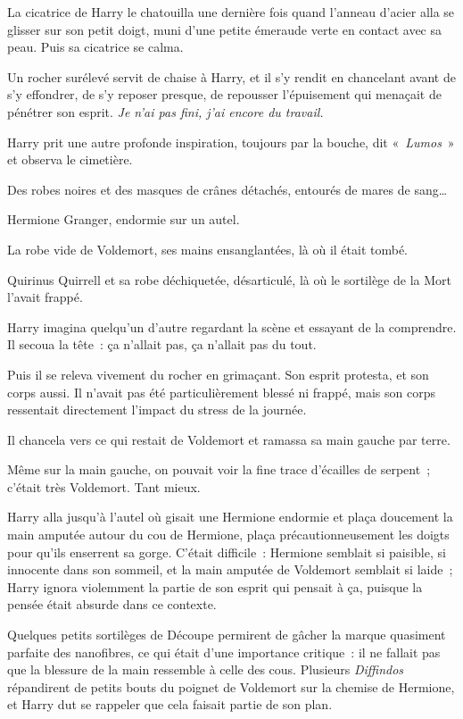 La cicatrice de Harry le chatouilla une dernière fois quand l'anneau d'acier alla se glisser sur son petit doigt, muni d'une petite émeraude verte en contact avec sa peau. Puis sa cicatrice se calma.

Un rocher surélevé servit de chaise à Harry, et il s'y rendit en chancelant avant de s'y effondrer, de s'y reposer presque, de repousser l'épuisement qui menaçait de pénétrer son esprit. \emph{Je n'ai pas fini, j'ai encore du travail.}

Harry prit une autre profonde inspiration, toujours par la bouche, dit «~\emph{Lumos}~» et observa le cimetière.

Des robes noires et des masques de crânes détachés, entourés de mares de sang…

Hermione Granger, endormie sur un autel.

La robe vide de Voldemort, ses mains ensanglantées, là où il était tombé.

Quirinus Quirrell et sa robe déchiquetée, désarticulé, là où le sortilège de la Mort l'avait frappé.

Harry imagina quelqu'un d'autre regardant la scène et essayant de la comprendre. Il secoua la tête~: ça n'allait pas, ça n'allait pas du tout.

Puis il se releva vivement du rocher en grimaçant. Son esprit protesta, et son corps aussi. Il n'avait pas été particulièrement blessé ni frappé, mais son corps ressentait directement l'impact du stress de la journée.

Il chancela vers ce qui restait de Voldemort et ramassa sa main gauche par terre.

Même sur la main gauche, on pouvait voir la fine trace d'écailles de serpent~; c'était très Voldemort. Tant mieux.

Harry alla jusqu'à l'autel où gisait une Hermione endormie et plaça doucement la main amputée autour du cou de Hermione, plaça précautionneusement les doigts pour qu'ils enserrent sa gorge. C'était difficile~: Hermione semblait si paisible, si innocente dans son sommeil, et la main amputée de Voldemort semblait si laide~; Harry ignora violemment la partie de son esprit qui pensait à ça, puisque la pensée était absurde dans ce contexte.

Quelques petits sortilèges de Découpe permirent de gâcher la marque quasiment parfaite des nanofibres, ce qui était d'une importance critique~: il ne fallait pas que la blessure de la main ressemble à celle des cous. Plusieurs \emph{Diffindos} répandirent de petits bouts du poignet de Voldemort sur la chemise de Hermione, et Harry dut se rappeler que cela faisait partie de son plan.

